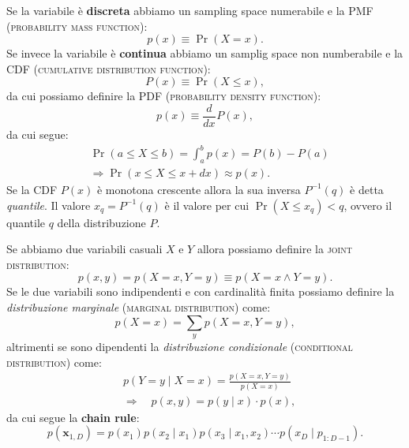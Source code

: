 \documentclass[10pt]{article}
\DeclareMathOperator{\pr}{Pr}
\renewcommand{\vec}[1]{\boldsymbol{#1}}
\newcommand{\im}[1]{\textsc{#1}}
\newcommand{\et}{\wedge}
\newcommand{\cond}{\mid}
\newcommand{\pare}[1]{
	\ensuremath{\left(#1\right)}
}
\newcommand{\deriv}[3][]{
	\ensuremath{\frac{d^{#1}{#2}}{d{#3}^{#1}}}
}
\theoremstyle{definition}
\begin{document}
Se la variabile è \textbf{discreta} abbiamo un sampling space numerabile e la PMF (\im{probability mass function}):
\begin{equation}
p\pare{x} \equiv \pr\pare{X = x}.
\end{equation}
Se invece la variabile è \textbf{continua} abbiamo un samplig space non numberabile e la CDF (\im{cumulative distribution function}):
\begin{equation}
P\pare{x} \equiv \pr\pare{X \leq x},
\end{equation}
da cui possiamo definire la PDF (\im{probability density function}):
\begin{equation}
p\pare{x} \equiv \deriv{}{x}P\pare{x},
\end{equation}
da cui segue:
\begin{align}
&\pr\pare{a \leq X \leq b} = \int_a^b p\pare{x} = P\pare{b} - P\pare{a} \\
&\Longrightarrow \pr\pare{x \leq X \leq x + dx} \approx p\pare{x}.
\end{align}
Se la CDF $P\pare{x}$ è monotona crescente allora la sua inversa $P^{-1}(q)$ è detta \textit{quantile}. Il valore $x_q = P^{-1}\pare{q}$ è il valore per cui $\pr\pare{X\leq x_q} < q$, ovvero il quantile $q$ della distribuzione $P$.

Se abbiamo due variabili casuali $X$ e $Y$ allora possiamo definire la \im{joint distribution}:
\begin{equation}
p\pare{x, y} = p\pare{X = x, Y = y} \equiv p\pare{X = x\et Y = y}.
\end{equation}
Se le due variabili sono indipendenti e con cardinalità finita possiamo definire la \textit{distribuzione marginale} (\im{marginal distribution}) come:
\begin{equation}
p\pare{X = x} = \sum_y p\pare{X=x, Y=y},
\end{equation}
altrimenti se sono dipendenti la \textit{distribuzione condizionale} (\im{conditional distribution}) come:
\begin{equation}
\begin{split}
&p\pare{Y=y\cond X=x} = \frac{p\pare{X=x, Y=y}}{p\pare{X=x}} \\
&\Longrightarrow\quad p\pare{x, y} = p\pare{y\cond x}\cdot p\pare{x},
\end{split}
\end{equation}
da cui segue la \textbf{chain rule}:
\begin{equation}
p\pare{\vec{x}_{1,D}} = p\pare{x_1} p\pare{x_2\cond x_1} p\pare{x_3\cond x_1, x_2}\cdots p\pare{x_D\cond p_{1: D-1}}.
\end{equation}
\end{document}
